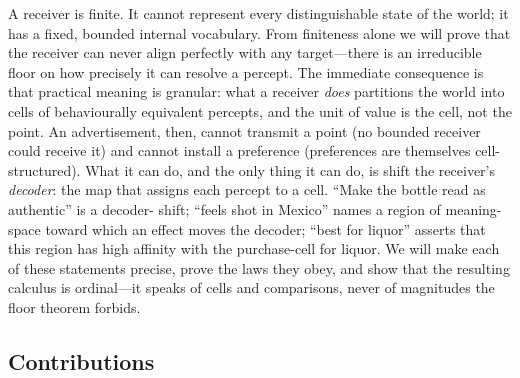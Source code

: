 \documentclass[twocolumn,11pt,a4paper]{article}
\theoremstyle{adv}
\theoremstyle{definition}
\theoremstyle{remark}
\begin{document}
A receiver is finite. It cannot represent every distinguishable state of
the world; it has a fixed, bounded internal vocabulary. From finiteness
alone we will prove that the receiver can never align perfectly with any
target---there is an irreducible floor on how precisely it can resolve a
percept. The immediate consequence is that practical meaning is granular:
what a receiver \emph{does} partitions the world into cells of
behaviourally equivalent percepts, and the unit of value is the cell, not
the point. An advertisement, then, cannot transmit a point (no bounded
receiver could receive it) and cannot install a preference (preferences
are themselves cell-structured). What it can do, and the only thing it can
do, is shift the receiver's \emph{decoder}: the map that assigns each
percept to a cell. ``Make the bottle read as authentic'' is a decoder-
shift; ``feels shot in Mexico'' names a region of meaning-space toward
which an effect moves the decoder; ``best for liquor'' asserts that this
region has high affinity with the purchase-cell for liquor. We will make
each of these statements precise, prove the laws they obey, and show that
the resulting calculus is ordinal---it speaks of cells and comparisons,
never of magnitudes the floor theorem forbids.

\subsection{Contributions}
\end{document}
